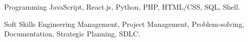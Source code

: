 

\begin{cvskills}

  \cvskill
    {Programming} %
    {JavaScript, React.js, Python, PHP, HTML/CSS, SQL, Shell.} %

  \cvskill
    {Soft Skills} %
    {Engineering Management, Project Management, Problem-solving, Documentation, Strategic Planning, SDLC.} %

\end{cvskills}
